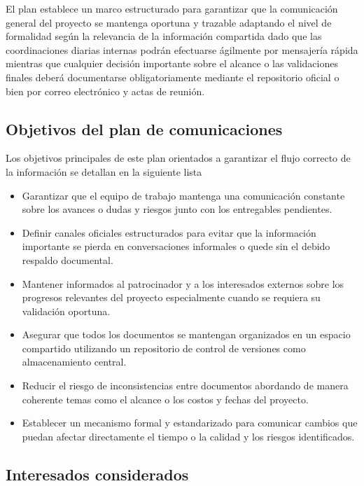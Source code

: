 \documentclass[11pt,spanish]{article}
\begin{document}
El plan establece un marco estructurado para garantizar que la comunicación general del proyecto se mantenga oportuna y trazable adaptando el nivel de formalidad según la relevancia de la información compartida dado que las coordinaciones diarias internas podrán efectuarse ágilmente por mensajería rápida mientras que cualquier decisión importante sobre el alcance o las validaciones finales deberá documentarse obligatoriamente mediante el repositorio oficial o bien por correo electrónico y actas de reunión.

\subsection{Objetivos del plan de comunicaciones}

Los objetivos principales de este plan orientados a garantizar el flujo correcto de la información se detallan en la siguiente lista

\begin{itemize}
    \item Garantizar que el equipo de trabajo mantenga una comunicación constante sobre los avances o dudas y riesgos junto con los entregables pendientes.
    \item Definir canales oficiales estructurados para evitar que la información importante se pierda en conversaciones informales o quede sin el debido respaldo documental.
    \item Mantener informados al patrocinador y a los interesados externos sobre los progresos relevantes del proyecto especialmente cuando se requiera su validación oportuna.
    \item Asegurar que todos los documentos se mantengan organizados en un espacio compartido utilizando un repositorio de control de versiones como almacenamiento central.
    \item Reducir el riesgo de inconsistencias entre documentos abordando de manera coherente temas como el alcance o los costos y fechas del proyecto.
    \item Establecer un mecanismo formal y estandarizado para comunicar cambios que puedan afectar directamente el tiempo o la calidad y los riesgos identificados.
\end{itemize}

\subsection{Interesados considerados}
\end{document}
